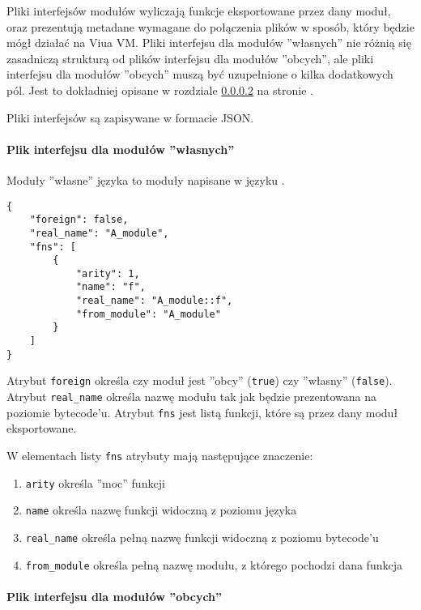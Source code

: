 Pliki interfejsów modułów wyliczają funkcje eksportowane przez dany moduł, oraz prezentują metadane wymagane
do połączenia plików w sposób, który będzie mógł działać na Viua VM. Pliki interfejsu dla modułów ''własnych''
nie różnią się zasadniczą strukturą od plików interfejsu dla modułów ''obcych'', ale pliki interfejsu dla
modułów ''obcych'' muszą być uzupełnione o kilka dodatkowych pól. Jest to dokładniej opisane w rozdziale
\ref{pliki_interfejsow_modulow_obcych} na stronie \pageref{pliki_interfejsow_modulow_obcych}.

Pliki interfejsów są zapisywane w formacie JSON.

\paragraph{Plik interfejsu dla modułów ''własnych''}

Moduły ''własne'' języka \ViuAct to moduły napisane w języku \ViuAct.

\begin{small}
\begin{lstlisting}
{
    "foreign": false,
    "real_name": "A_module",
    "fns": [
        {
            "arity": 1,
            "name": "f",
            "real_name": "A_module::f",
            "from_module": "A_module"
        }
    ]
}
\end{lstlisting}
\end{small}

Atrybut \texttt{foreign} określa czy moduł jest ''obcy'' (\texttt{true}) czy ''własny'' (\texttt{false}).
Atrybut \texttt{real\_name} określa nazwę modułu tak jak będzie prezentowana na poziomie bytecode'u.
Atrybut \texttt{fns} jest listą funkcji, które są przez dany moduł eksportowane.

W elementach listy \texttt{fns} atrybuty mają następujące znaczenie:

\begin{enumerate}
    \item \texttt{arity} określa ''moc'' funkcji
    \item \texttt{name} określa nazwę funkcji widoczną z poziomu języka \ViuAct
    \item \texttt{real\_name} określa pełną nazwę funkcji widoczną z poziomu bytecode'u
    \item \texttt{from\_module} określa pełną nazwę modułu, z którego pochodzi dana funkcja
\end{enumerate}

\paragraph{Plik interfejsu dla modułów ''obcych''}
\label{pliki_interfejsow_modulow_obcych}

